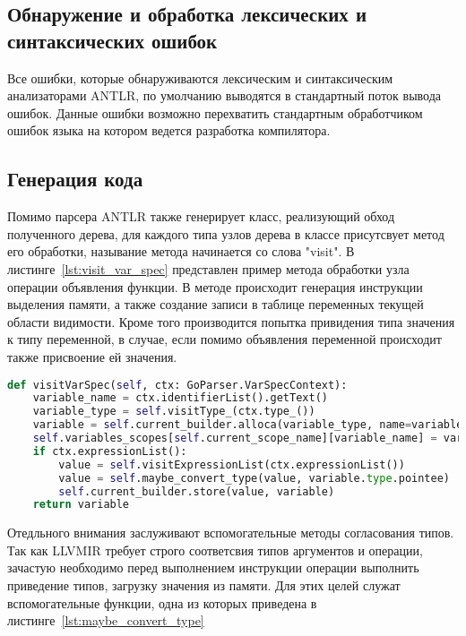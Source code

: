 \subsection{Обнаружение и обработка лексических и синтаксических ошибок}\label{subsec:errors}
Все ошибки, которые обнаруживаются лексическим и синтаксическим анализаторами ANTLR, по умолчанию выводятся в стандартный поток вывода ошибок.
Данные ошибки возможно перехватить стандартным обработчиком ошибок языка на котором ведется разработка компилятора.

\subsection{Генерация кода}\label{subsec:codegen}
Помимо парсера ANTLR также генерирует класс, реализующий обход полученного дерева, для каждого типа узлов дерева
в классе присутсвует метод его обработки, называние метода начинается со слова "visit". В листинге~\ref{lst:visit_var_spec}
представлен пример метода обработки узла операции объявления функции.
В методе происходит генерация инструкции выделения памяти, а также создание записи в таблице переменных текущей области видимости.
Кроме того производится попытка привидения типа значения к типу переменной, в случае, если помимо объявления переменной
происходит также присвоение ей значения.

\begin{lstlisting}[language=Python,caption={Метод обработки объявления/определения переменной},label={lst:visit_var_spec}]
def visitVarSpec(self, ctx: GoParser.VarSpecContext):
    variable_name = ctx.identifierList().getText()
    variable_type = self.visitType_(ctx.type_())
    variable = self.current_builder.alloca(variable_type, name=variable_name)
    self.variables_scopes[self.current_scope_name][variable_name] = variable
    if ctx.expressionList():
        value = self.visitExpressionList(ctx.expressionList())
        value = self.maybe_convert_type(value, variable.type.pointee)
        self.current_builder.store(value, variable)
    return variable
\end{lstlisting}

Отедльного внимания заслуживают вспомогательные методы согласования типов. Так как LLVMIR требует строго соответсвия
типов аргументов и операции, зачастую необходимо перед выполнением инструкции операции выполнить приведение типов,
загрузку значения из памяти. Для этих целей служат вспомогательные функции, одна из которых приведена в листинге~\ref{lst:maybe_convert_type}

